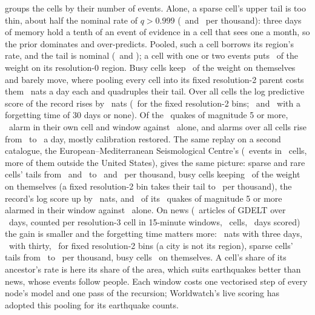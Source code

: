 \documentclass[11pt,a4paper]{article}
\begin{document}
 groups the cells by their number of events. Alone, a sparse cell's upper tail
is too thin, about half the nominal rate of $q > 0.999$ (\streamSparseTailAlone\ and
\streamRareTailAlone\ per thousand): three days of memory hold a tenth of an event of evidence in a
cell that sees one a month, so the prior dominates and over-predicts. Pooled, such a cell borrows
its region's rate, and the tail is nominal (\streamSparseTailTree\ and \streamRareTailTree); a cell
with one or two events puts \streamRareBase\ of the weight on its resolution-0 region. Busy cells
keep \streamBusySelf\ of the weight on themselves and barely move, where pooling every cell into its
fixed resolution-2 parent costs them \streamBusyResTwoLoss\ nats a day each and quadruples their
tail. Over all cells the log predictive score of the record rises by \streamGain\ nats
(\streamGainResTwo\ for the fixed resolution-2 bins; \streamGainMonth\ and \streamGainAll\ with a
forgetting time of 30 days or none). Of the \streamBigQuakes\ quakes of magnitude 5 or more,
\streamBigTree\ alarm in their own cell and window against \streamBigAlone\ alone, and alarms over
all cells rise from \streamAlarmsAlone\ to \streamAlarmsTree\ a day, mostly calibration restored. The same
replay on a second catalogue, the European--Mediterranean Seismological Centre's (\emscEvents\
events in \emscCells\ cells, more of them outside the United States), gives the same picture: sparse
and rare cells' tails from \emscSparseTailAlone\ and \emscRareTailAlone\ to \emscSparseTailTree\ and
\emscRareTailTree\ per thousand, busy cells keeping \emscBusySelf\ of the weight on themselves (a
fixed resolution-2 bin takes their tail to \emscBusyTailResTwo\ per thousand), the record's log score up by
\emscGain\ nats, and \emscBigTreePct\ of its \emscBigQuakes\ quakes of magnitude 5 or more alarmed in
their window against \emscBigAlonePct\ alone. On news (\gdeltArticles\ articles of GDELT over \gdeltRecordDays\
days, counted per resolution-3 cell in 15-minute windows, \gdeltCells\ cells, \gdeltDays\ days
scored) the gain is smaller
and the forgetting time matters more: \gdeltGain\ nats with three days, \gdeltGainMonth\ with
thirty, \gdeltGainResTwo\ for fixed resolution-2 bins (a city is not its region), sparse cells'
tails from \gdeltSparseTailAlone\ to \gdeltSparseTailTree\ per thousand, busy cells \gdeltBusySelf\
on themselves. A cell's share of its ancestor's rate is here its share of the area, which suits
earthquakes better than news, whose events follow people. Each window costs one vectorised step of
every node's model and one pass of the recursion; Worldwatch's live scoring has adopted this
pooling for its earthquake counts.
\end{document}
